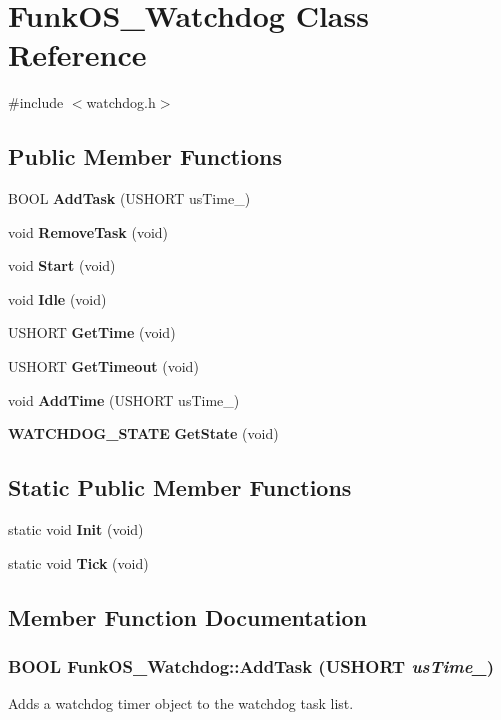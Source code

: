 \section{FunkOS\_\-Watchdog Class Reference}
\label{class_funk_o_s___watchdog}


{\ttfamily \#include $<$watchdog.h$>$}\subsection*{Public Member Functions}
\begin{DoxyCompactItemize}
\item 
BOOL {\bf AddTask} (USHORT usTime\_\-)
\item 
void {\bf RemoveTask} (void)
\item 
void {\bf Start} (void)
\item 
void {\bf Idle} (void)
\item 
USHORT {\bf GetTime} (void)
\item 
USHORT {\bf GetTimeout} (void)
\item 
void {\bf AddTime} (USHORT usTime\_\-)
\item 
{\bf WATCHDOG\_\-STATE} {\bf GetState} (void)
\end{DoxyCompactItemize}
\subsection*{Static Public Member Functions}
\begin{DoxyCompactItemize}
\item 
static void {\bf Init} (void)
\item 
static void {\bf Tick} (void)
\end{DoxyCompactItemize}


\subsection{Member Function Documentation}
\subsubsection[{AddTask}]{\setlength{\rightskip}{0pt plus 5cm}BOOL FunkOS\_\-Watchdog::AddTask (USHORT {\em usTime\_\-})}\label{class_funk_o_s___watchdog_addcb286e29d7c4c94bf53ed475dffa5b}
Adds a watchdog timer object to the watchdog task list.


